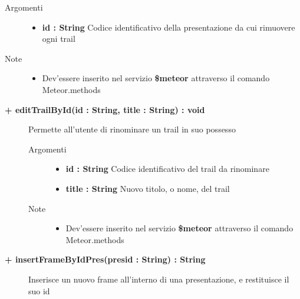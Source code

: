 \begin{description}
\begin{description}
		\begin{description}
			\item[Argomenti] \hfill
				\begin{itemize}
				
					\item \textbf{id :  String		} \hfill
					Codice identificativo della presentazione da cui rimuovere ogni trail
					
				\end{itemize}
			\item[Note] \hfill
			\begin{itemize}
					\item Dev'essere inserito nel servizio \textbf{\$meteor} attraverso il comando Meteor.methods
				\end{itemize}
		\end{description}
	\end{description}
	
	\begin{description}
		\item[\textbf{\color{blue}+ editTrailById(id : String, title : String) : void			}] \hfill
			Permette all'utente di rinominare un trail in suo possesso
			
		\begin{description}
			\item[Argomenti] \hfill
				\begin{itemize}
				
					\item \textbf{id : String		} \hfill
					Codice identificativo del trail da rinominare
					\item \textbf{title : String		} \hfill
					Nuovo titolo, o nome, del trail
					
				\end{itemize}
			\item[Note] \hfill
			\begin{itemize}
					\item Dev'essere inserito nel servizio \textbf{\$meteor} attraverso il comando Meteor.methods
				\end{itemize}
		\end{description}
	\end{description}
	
	\begin{description}
		\item[\textbf{\color{blue}+ insertFrameByIdPres(presid : String) : String			}] \hfill
			Inserisce un nuovo frame all'interno di una presentazione, e restituisce il suo id
			

\end{description}
\end{description}
